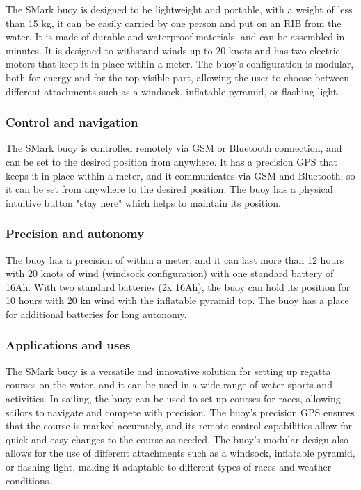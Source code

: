 \documentclass[12pt, twoside]{report}
\begin{document}
The SMark buoy is designed to be lightweight and portable, with a weight of less than 15 kg, it can be easily carried by one person and put on an RIB from the water. It is made of durable and waterproof materials, and can be assembled in minutes. It is designed to withstand winds up to 20 knots and has two electric motors that keep it in place within a meter. The buoy's configuration is modular, both for energy and for the top visible part, allowing the user to choose between different attachments such as a windsock, inflatable pyramid, or flashing light.

\subsubsection{Control and navigation}

The SMark buoy is controlled remotely via GSM or Bluetooth connection, and can be set to the desired position from anywhere. It has a precision GPS that keeps it in place within a meter, and it communicates via GSM and Bluetooth, so it can be set from anywhere to the desired position. The buoy has a physical intuitive button "stay here" which helps to maintain its position.

\subsubsection{Precision and autonomy}

The buoy has a precision of within a meter, and it can last more than 12 hours with 20 knots of wind (windsock configuration) with one standard battery of 16Ah. With two standard batteries (2x 16Ah), the buoy can hold its position for 10 hours with 20 kn wind with the inflatable pyramid top. The buoy has a place for additional batteries for long autonomy.


\subsubsection{Applications and uses}

The SMark buoy is a versatile and innovative solution for setting up regatta courses on the water, and it can be used in a wide range of water sports and activities. In sailing, the buoy can be used to set up courses for races, allowing sailors to navigate and compete with precision. The buoy's precision GPS ensures that the course is marked accurately, and its remote control capabilities allow for quick and easy changes to the course as needed. The buoy's modular design also allows for the use of different attachments such as a windsock, inflatable pyramid, or flashing light, making it adaptable to different types of races and weather conditions.
\end{document}
